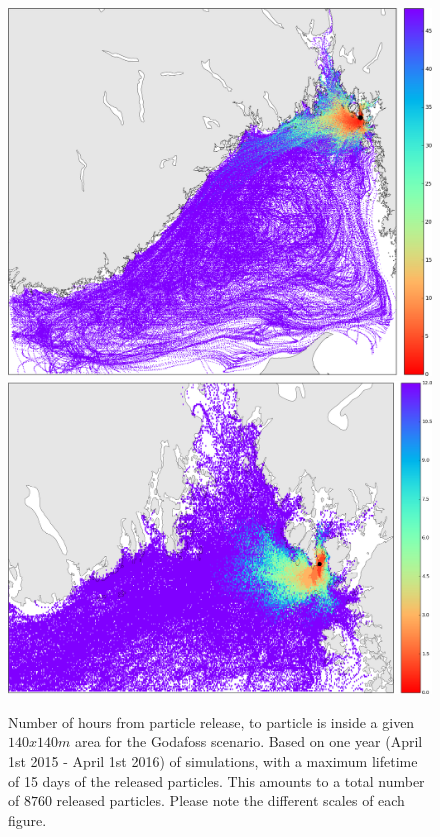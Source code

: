 \begin{figure}[ht]
\centerline{
\includegraphics*[width=.5\textwidth]{Figurer/opendrift/opendrift_godafoss_shortest_time_crop}
\includegraphics*[width=.5\textwidth]{Figurer/opendrift/opendrift_godafoss_shortest_time_zoom_crop}
}
\caption{\small
Number of hours from particle release, to particle is inside a given $140x140m$ area for the Godafoss scenario. Based on one year (April 1st 2015 - April 1st 2016) of simulations, with a maximum lifetime of 15 days of the released particles. This amounts to a total number of $8760$ released particles. Please note the different scales of each figure.}
\label{fig:opendrift_godafoss_time}
\end{figure}


